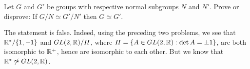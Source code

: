 \begin{exercise} Let $G$ and $G'$ be groups with respective normal subgroups
$N$ and $N'$.  Prove or disprove: If $G/N\simeq G'/N'$ then $G\simeq
G'$.
\end{exercise}

\begin{solution}[print=false]
The statement is false.  Indeed, using the preceding two problems, we see that $\mathbb{R}^*/\{1,-1\}$ and $GL(2,\mathbb{R})/H$,
where $H=\{A\in GL(2,\mathbb{R}):\det A =\pm 1\}$, are both isomorphic
to $\mathbb{R}^+$, hence are isomorphic to each other. But we know that
$\mathbb{R}^* \not\simeq GL(2,\mathbb{R})$.\end{solution}
